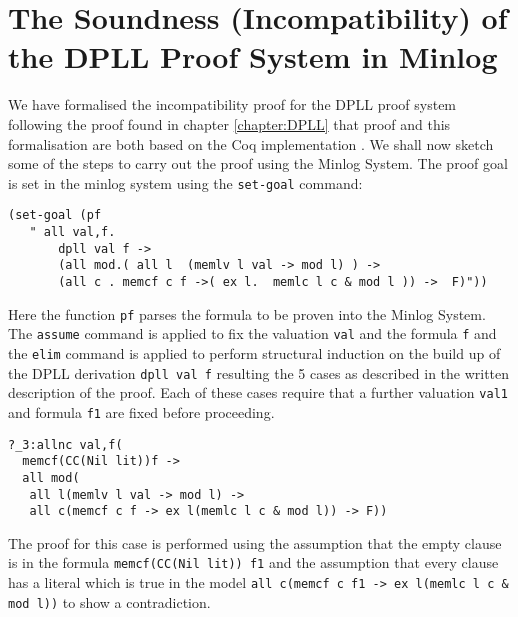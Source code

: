 \section{The Soundness (Incompatibility) of the DPLL Proof System in Minlog}
We have formalised the incompatibility proof for the DPLL proof system following the proof found in chapter \ref{chapter:DPLL} that proof and this formalisation are both based on the Coq implementation \cite{}. We shall now sketch some of the steps to carry out the proof using the Minlog System.
The proof goal is set in the minlog system using the \texttt{set-goal} command:

\begin{lstlisting}
(set-goal (pf 
   " all val,f.
       dpll val f ->  
       (all mod.( all l  (memlv l val -> mod l) ) -> 
       (all c . memcf c f ->( ex l.  memlc l c & mod l )) ->  F)"))
\end{lstlisting}

Here the function \texttt{pf} parses the formula to be proven into the Minlog System. The \texttt{assume} command is applied to fix the valuation \texttt{val} and the formula \texttt{f} and the \texttt{elim} command is applied to perform structural induction on the build up of the DPLL derivation \texttt{dpll val f} resulting the 5 cases as described in the written description of the proof. Each of these cases require that a further valuation \texttt{val1} and formula \texttt{f1} are fixed before proceeding.

\begin{lstlisting}[caption = "The Conflict Case in Minlog"]
?_3:allnc val,f(
  memcf(CC(Nil lit))f ->
  all mod(
   all l(memlv l val -> mod l) ->
   all c(memcf c f -> ex l(memlc l c & mod l)) -> F))
\end{lstlisting}

The proof for this case is performed using the assumption that the empty clause is in the formula \texttt{memcf(CC(Nil lit)) f1} and the assumption that every clause has a literal which is true in the model \texttt{all c(memcf c f1 -> ex l(memlc l c \& mod l))} to show a contradiction. 


